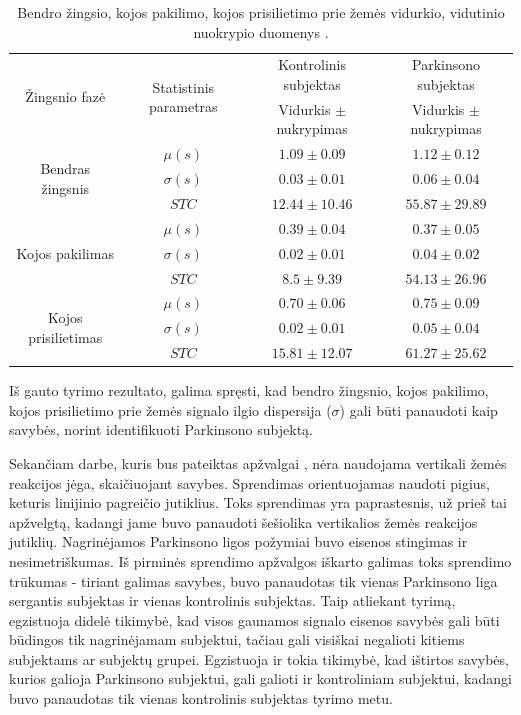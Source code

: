 \documentclass[]{vgtuef}
\begin{document}
\begin{table}
  \centering
  \caption{Bendro žingsio, kojos pakilimo, kojos prisilietimo prie žemės vidurkio, vidutinio nuokrypio duomenys \cite{5280353}.}
  \label{table:gait_corr_params}
  \renewcommand{\arraystretch}{1.3}
	\begin{tabular}{|c|c|c|c|} \hline
		 \multirow{2}{*}{Žingsnio fazė} & 
		 \multirow{2}{*}{Statistinis parametras} & Kontrolinis subjektas & Parkinsono subjektas \\ 	\cline{3-4}
		 & & Vidurkis $\pm$ nukrypimas & Vidurkis $\pm$ nukrypimas \\ \hline
		 \multirow{3}{*}{Bendras žingsnis} 
		 	& $\mu(s)$    & $1.09 \pm 0.09$   & $1.12 \pm 0.12$ \\ \cline{2-4}
		 	& $\sigma(s)$ & $0.03 \pm 0.01$   & $0.06 \pm 0.04$ \\ \cline{2-4} 
		 	& $STC$       & $12.44 \pm 10.46$ & $55.87 \pm 29.89$ \\ \hline
		 \multirow{3}{*}{Kojos pakilimas}
	 	 	& $\mu(s)$    & $0.39 \pm 0.04$   & $0.37 \pm 0.05$ \\ \cline{2-4}
		 	& $\sigma(s)$ & $0.02 \pm 0.01$   & $0.04 \pm 0.02$ \\ \cline{2-4} 
		 	& $STC$       & $8.5 \pm 9.39$    & $54.13 \pm 26.96$ \\ \hline
		 \multirow{3}{*}{Kojos prisilietimas}
		 	& $\mu(s)$    & $0.70 \pm 0.06$   & $0.75 \pm 0.09$ \\ \cline{2-4}
		 	& $\sigma(s)$ & $0.02 \pm 0.01$   & $0.05 \pm 0.04$ \\ \cline{2-4} 
		 	& $STC$       & $15.81 \pm 12.07$ & $61.27 \pm 25.62$ \\ \hline
	\end{tabular}
\end{table}

Iš gauto tyrimo rezultato, galima spręsti, kad bendro žingsnio, kojos pakilimo, kojos prisilietimo prie žemės signalo ilgio dispersija ($\sigma$) gali būti panaudoti kaip savybės, norint identifikuoti Parkinsono subjektą.

Sekančiam darbe, kuris bus pateiktas apžvalgai \cite{6091948}, nėra naudojama vertikali žemės reakcijos jėga, skaičiuojant savybes. Sprendimas orientuojamas naudoti pigius, keturis linijinio pagreičio jutiklius. Toks sprendimas yra paprastesnis, už prieš tai apžvelgtą, kadangi jame buvo panaudoti šešiolika vertikalios žemės reakcijos jutiklių. Nagrinėjamos Parkinsono ligos požymiai buvo eisenos stingimas ir nesimetriškumas. Iš pirminės sprendimo apžvalgos iškarto galimas toks sprendimo trūkumas - tiriant galimas savybes, buvo panaudotas tik vienas Parkinsono liga sergantis subjektas ir vienas kontrolinis subjektas. Taip atliekant tyrimą, egzistuoja didelė tikimybė, kad visos gaunamos signalo eisenos savybės gali būti būdingos tik nagrinėjamam subjektui, tačiau gali visiškai negalioti kitiems subjektams ar subjektų grupei. Egzistuoja ir tokia tikimybė, kad ištirtos savybės, kurios galioja Parkinsono subjektui, gali galioti ir kontroliniam subjektui, kadangi buvo panaudotas tik vienas kontrolinis subjektas tyrimo metu.
\end{document}
